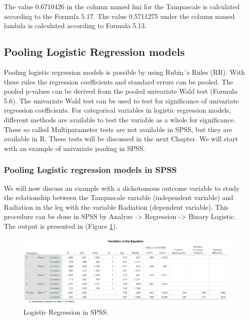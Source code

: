 \documentclass[]{book}
\theoremstyle{definition}
\theoremstyle{definition}
\theoremstyle{definition}
\theoremstyle{remark}
\begin{document}
The value 0.6710426 in the column named fmi for the Tampascale is
calculated according to the Formula 5.17. The value 0.5711275 under the
column named lambda is calculated according to Formula 5.13.

\subsection{Pooling Logistic Regression
models}\label{pooling-logistic-regression-models}

Pooling logistic regression models is possible by using Rubin´s Rules
(RR). With these rules the regression coefficients and standard errors
can be pooled. The pooled p-values can be derived from the pooled
univariate Wald test (Formula 5.6). The univariate Wald test can be used
to test for significance of univariate regression coefficients. For
categorical variables in logistic regression models, different methods
are available to test the variable as a whole for significance. These so
called Multiparameter tests are not available in SPSS, but they are
available in R. These tests will be discussed in the next Chapter. We
will start with an example of univariate pooling in SPSS.

\subsubsection{Pooling Logistic regression models in
SPSS}\label{pooling-logistic-regression-models-in-spss}

We will now discuss an example with a dichotomous outcome variable to
study the relationship between the Tampascale variable (independent
variable) and Radiation in the leg with the variable Radiation
(dependent variable). This procedure can be done in SPSS by Analyze
-\textgreater{} Regression -\textgreater{} Binary Logistic. The output
is presented in (Figure \ref{fig:tab5-9}).

\begin{figure}

{\centering \includegraphics[width=0.9\linewidth]{images/table5.9} 

}

\caption{Logistic Regression in SPSS.}\label{fig:tab5-9}
\end{figure}
\end{document}
